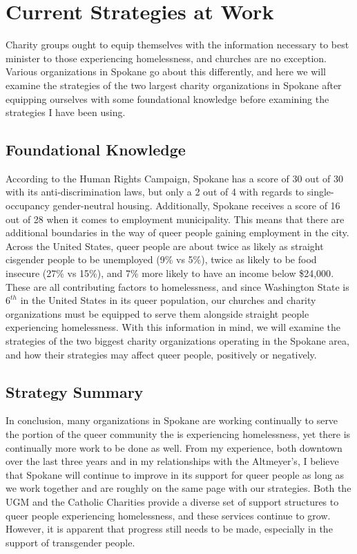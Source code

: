 
\section{Current Strategies at Work}

    Charity groups ought to equip themselves with the information necessary to best minister to those experiencing homelessness, and churches are no exception.
    Various organizations in Spokane go about this differently, and here we will examine the strategies of the two largest charity organizations in Spokane after equipping ourselves with some foundational knowledge before examining the strategies I have been using.

    \subsection{Foundational Knowledge}
        According to the Human Rights Campaign, Spokane has a score of 30 out of 30 with its anti-discrimination laws, but only a 2 out of 4 with regards to single-occupancy gender-neutral housing\cite{hrc}.
        Additionally, Spokane receives a score of 16 out of 28 when it comes to employment municipality.
        This means that there are additional boundaries in the way of queer people gaining employment in the city.
        Across the United States, queer people are about twice as likely as straight cisgender people to be unemployed (9\% vs 5\%), twice as likely to be food insecure (27\% vs 15\%), and 7\% more likely to have an income below \$24,000\cite{hrc}.
        These are all contributing factors to homelessness, and since Washington State is $6^{th}$ in the United States in its queer population, our churches and charity organizations must be equipped to serve them alongside straight people experiencing homelessness.
        With this information in mind, we will examine the strategies of the two biggest charity organizations operating in the Spokane area, and how their strategies may affect queer people, positively or negatively.

    
    
    \subsection{Strategy Summary}
        In conclusion, many organizations in Spokane are working continually to serve the portion of the queer community the is experiencing homelessness, yet there is continually more work to be done as well.
        From my experience, both downtown over the last three years and in my relationships with the Altmeyer's, I believe that Spokane will continue to improve in its support for queer people as long as we work together and are roughly on the same page with our strategies.
        Both the UGM and the Catholic Charities provide a diverse set of support structures to queer people experiencing homelessness, and these services continue to grow.
        However, it is apparent that progress still needs to be made, especially in the support of transgender people.
